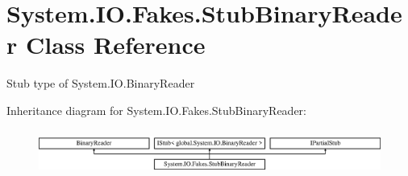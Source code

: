\hypertarget{class_system_1_1_i_o_1_1_fakes_1_1_stub_binary_reader}{\section{System.\-I\-O.\-Fakes.\-Stub\-Binary\-Reader Class Reference}
\label{class_system_1_1_i_o_1_1_fakes_1_1_stub_binary_reader}
}


Stub type of System.\-I\-O.\-Binary\-Reader 


Inheritance diagram for System.\-I\-O.\-Fakes.\-Stub\-Binary\-Reader\-:\begin{figure}[H]
\begin{center}
\leavevmode
\includegraphics[height=1.499331cm]{class_system_1_1_i_o_1_1_fakes_1_1_stub_binary_reader}
\end{center}
\end{figure}
